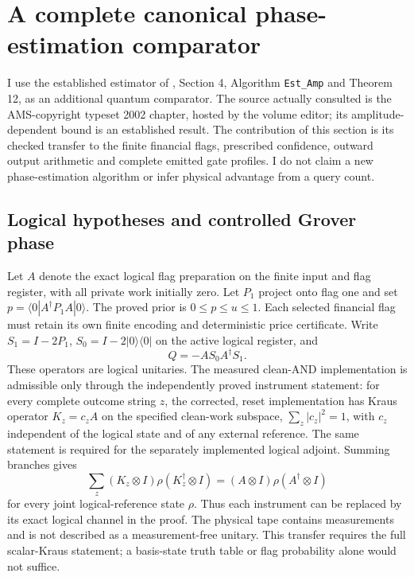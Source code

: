 \section{A complete canonical phase-estimation comparator}
\label{sec:canonical-qpe-comparator}

I use the established estimator of \citet{brassard}, Section 4, Algorithm
\texttt{Est\_Amp} and Theorem 12, as an additional quantum comparator. The
source actually consulted is the AMS-copyright typeset 2002 chapter, hosted
by the volume editor; its amplitude-dependent bound is an established
result. The contribution of this section is its checked transfer to the
finite financial flags, prescribed confidence, outward output arithmetic
and complete emitted gate profiles. I do not claim a new phase-estimation
algorithm or infer physical advantage from a query count.

\subsection{Logical hypotheses and controlled Grover phase}

Let $A$ denote the exact logical flag preparation on the finite input and
flag register, with all private work initially zero. Let $P_1$ project onto
flag one and set $p=\langle0|A^\dagger P_1 A|0\rangle$. The proved prior is
$0\leq p\leq u\leq1$. Each selected financial flag must retain its own
finite encoding and deterministic price certificate. Write
$S_1=I-2P_1$, $S_0=I-2|0\rangle\langle0|$ on the active logical register,
and
\[
 Q=-A S_0 A^\dagger S_1.
\]
These operators are logical unitaries. The measured clean-AND implementation
is admissible only through the independently proved instrument statement:
for every complete outcome string $z$, the corrected, reset implementation
has Kraus operator $K_z=c_z A$ on the specified clean-work subspace,
$\sum_z|c_z|^2=1$, with $c_z$ independent of the logical state and of any
external reference. The same statement is required for the separately
implemented logical adjoint. Summing branches gives
\[
 \sum_z(K_z\otimes I)\rho(K_z^\dagger\otimes I)
 =(A\otimes I)\rho(A^\dagger\otimes I)
\]
for every joint logical-reference state $\rho$. Thus each instrument can be
replaced by its exact logical channel in the proof. The physical tape
contains measurements and is not described as a measurement-free unitary.
This transfer requires the full scalar-Kraus statement; a basis-state truth
table or flag probability alone would not suffice.

